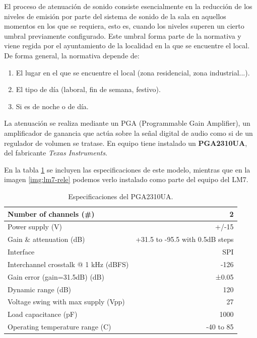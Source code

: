 El proceso de atenuación de sonido consiste esencialmente en la reducción de los niveles de emisión por parte del sistema de sonido de la sala en aquellos momentos en los que se requiera, esto es, cuando los niveles superen un cierto umbral previamente configurado. Este umbral forma parte de la normativa y viene regida por el ayuntamiento de la localidad en la que se encuentre el local. De forma general, la normativa depende de:
\begin{enumerate}
	\item El lugar en el que se encuentre el local (zona residencial, zona industrial...).
	\item El tipo de día (laboral, fin de semana, festivo).
	\item Si es de noche o de día.
\end{enumerate}

La atenuación se realiza mediante un \acrshort{PGA} (Programmable Gain Amplifier), un amplificador de ganancia que actúa sobre la señal digital de audio como si de un regulador de volumen se tratase. En equipo tiene instalado un \textbf{PGA2310UA}, del fabricante \textit{Texas Instruments}.

En la tabla \ref{tab:lms7-pga} se incluyen las especificaciones de este modelo, mientras que en la imagen \ref{img:lm7-rele} podemos verlo instalado como parte del equipo del \acrshort{LM7}.

\begin{table}[h]
	\centering
	\begin{tabular}{lr}
	\hline
	Number of channels (\#)               & 2                               \\ \hline
	Power supply (V)                      & +/-15                           \\ \hline
	Gain \& attenuation (dB)              & +31.5 to -95.5 with 0.5dB steps \\ \hline
	Interface                             & SPI                             \\ \hline
	Interchannel crosstalk @ 1 kHz (dBFS) & -126                            \\ \hline
	Gain error (gain=31.5dB) (dB)         & ±0.05                           \\ \hline
	Dynamic range (dB)                    & 120                             \\ \hline
	Voltage swing with max supply (Vpp)   & 27                              \\ \hline
	Load capacitance (pF)                 & 1000                            \\ \hline
	Operating temperature range (C)       & -40 to 85                       \\ \hline
	\end{tabular}
	\caption{Especificaciones del PGA2310UA.}
	\label{tab:lms7-pga}
\end{table}

